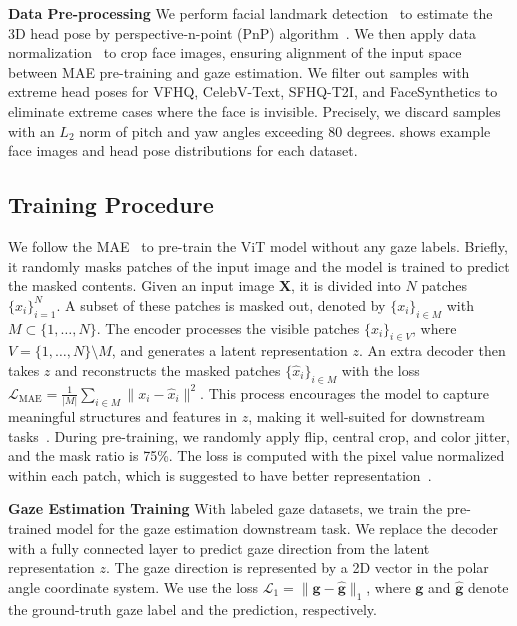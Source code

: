 \noindent\textbf{Data Pre-processing}
We perform facial landmark detection~\cite{bulat2017far} to estimate the 3D head pose by perspective-n-point (PnP) algorithm~\cite{fischler1981random}.
We then apply data normalization~\cite{zhang2018revisiting} to crop face images, ensuring alignment of the input space between MAE pre-training and gaze estimation. 
We filter out samples with extreme head poses for VFHQ, CelebV-Text, SFHQ-T2I, and FaceSynthetics to eliminate extreme cases where the face is invisible. 
Precisely, we discard samples with an $L_2$ norm of pitch and yaw angles exceeding 80 degrees.
 shows example face images and head pose distributions for each dataset.


\subsection{Training Procedure}

We follow the MAE~\cite{he2022masked} to pre-train the ViT model without any gaze labels. 
Briefly, it randomly masks patches of the input image and the model is trained to predict the masked contents.
Given an input image $\bm{X}$, it is divided into $N$ patches $\{x_i\}_{i=1}^N$.
A subset of these patches is masked out, denoted by $\{x_i\}_{i \in M}$ with $M \subset \{1, \ldots, N\}$.
The encoder processes the visible patches $\{x_i\}_{i \in V}$, where $V = \{1, \ldots, N\} \setminus M$, and generates a latent representation $z$.
An extra decoder then takes $z$ and reconstructs the masked patches $\{\hat{x}_i\}_{i \in M}$ with the loss $\mathcal{L}_{\text{MAE}} = \frac{1}{|M|} \sum_{i \in M} \| x_i - \hat{x}_i \|^2$.
This process encourages the model to capture meaningful structures and features in $z$, making it well-suited for downstream tasks~\cite{khirodkar2025sapiens}.
During pre-training, we randomly apply flip, central crop, and color jitter, and the mask ratio is 75\%.
The loss is computed with the pixel value normalized within each patch, which is suggested to have better representation~\cite{he2022masked}. 


\noindent\textbf{Gaze Estimation Training}
With labeled gaze datasets, we train the pre-trained model for the gaze estimation downstream task. 
We replace the decoder with a fully connected layer to predict gaze direction from the latent representation $z$.
The gaze direction is represented by a 2D vector in the polar angle coordinate system.
We use the loss $\mathcal{L}_{1} = \| \bm{g} - \hat{\bm{g}} \|_1$, where $\bm{g}$ and $\hat{\bm{g}}$ denote the ground-truth gaze label and the prediction, respectively.


